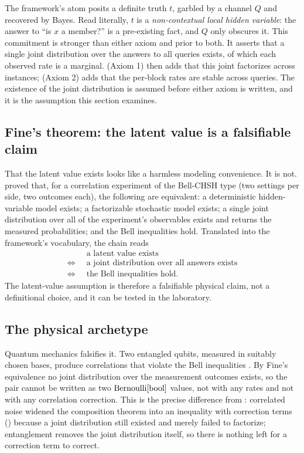 The framework's atom posits a definite truth $t$, garbled by a channel
$Q$ and recovered by Bayes. Read literally, $t$ is a \emph{non-contextual
local hidden variable}: the answer to ``is $x$ a member?'' is a
pre-existing fact, and $Q$ only obscures it. This commitment is stronger
than either axiom and prior to both. It asserts that a single joint
distribution over the answers to all queries exists, of which each
observed rate is a marginal.  (Axiom 1) then adds
that this joint factorizes across instances; 
(Axiom 2) adds that the per-block rates are stable across queries. The
existence of the joint distribution is assumed before either axiom is
written, and it is the assumption this section examines.

\subsection*{Fine's theorem: the latent value is a falsifiable claim}

That the latent value exists looks like a harmless modeling convenience.
It is not. \textcite{fine-1982} proved that, for a correlation
experiment of the Bell-CHSH type (two settings per side, two outcomes
each), the following are equivalent: a deterministic hidden-variable
model exists; a factorizable stochastic model exists; a single joint
distribution over all of the experiment's observables exists and returns
the measured probabilities; and the Bell inequalities hold. Translated
into the framework's vocabulary, the chain reads
\[
\begin{aligned}
  &\text{a latent value exists}\\
  \Longleftrightarrow\;\; &\text{a joint distribution over all answers exists}\\
  \Longleftrightarrow\;\; &\text{the Bell inequalities hold.}
\end{aligned}
\]
The latent-value assumption is therefore a falsifiable physical claim,
not a definitional choice, and it can be tested in the laboratory.

\subsection*{The physical archetype}

Quantum mechanics falsifies it. Two entangled qubits, measured in
suitably chosen bases, produce correlations that violate the Bell
inequalities \parencite{bell-1964}. By Fine's equivalence no joint
distribution over the measurement outcomes exists, so the pair cannot be
written as two $\mathrm{Bernoulli}[\mathrm{bool}]$ values, not with any rates and not
with any correlation correction. This is the precise difference from
: correlated noise widened the composition
theorem into an inequality with correction terms
() because a joint distribution
still existed and merely failed to factorize; entanglement removes the
joint distribution itself, so there is nothing left for a correction term
to correct.

